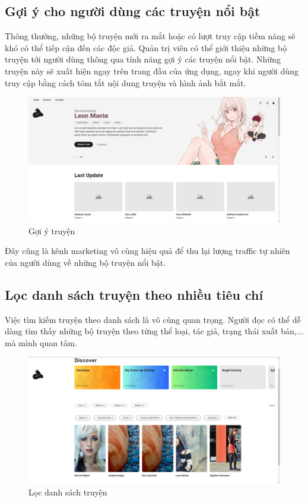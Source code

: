 \documentclass[./../main.tex]{subfiles}
\begin{document}
\subsection{Gợi ý cho người dùng các truyện nổi bật}
Thông thường, những bộ truyện mới ra mắt hoặc có lượt truy cập tiềm năng sẽ khó có thể tiếp cận đến các độc giả. Quản trị viên có thể giới thiệu những bộ truyện tới người dùng thông qua tính năng gợi ý các truyện nổi bật. Những truyện này sẽ xuất hiện ngay trên trang đầu của ứng dụng, ngay khi người dùng truy cập bằng cách tóm tắt nội dung truyện và hình ảnh bắt mắt.

\begin{figure}[!htb]
	\centering
	\includegraphics[width=\linewidth]{./images/recommend.png}
	\caption{Gợi ý truyện}
\end{figure}

Đây cũng là kênh marketing vô cùng hiệu quả để thu lại lượng traffic tự nhiên của người dùng về những bộ truyện nổi bật.
\subsection{Lọc danh sách truyện theo nhiều tiêu chí}
Việc tìm kiếm truyện theo danh sách là vô cùng quan trọng. Người đọc có thể dễ dàng tìm thấy những bộ truyện theo từng thể loại, tác giả, trạng thái xuất bản,... mà mình quan tâm.

\begin{figure}[!htb]
	\centering
	\includegraphics[width=\linewidth]{./images/filter.png}
	\caption{Lọc danh sách truyện}
\end{figure}
\end{document}
